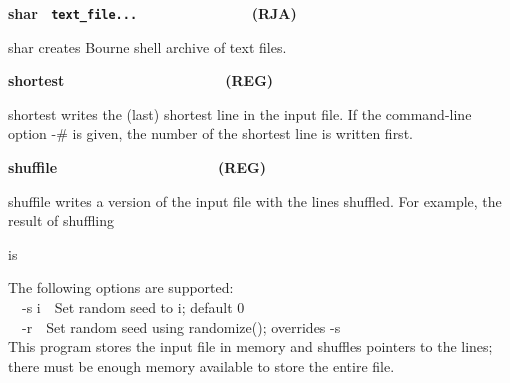 {\sffamily\bfseries
shar
\ \texttt{\textmd{text\_file...\ \ \ \ \ \ \ \ \ \ \ \ \ \ \ \ }}(RJA)}

\textsf{shar} creates Bourne shell archive of text files. 

{\sffamily\bfseries
shortest\ \ \ \ \ \ \ \ \ \ \ \ \ \ \ \ \ \ \ \ (REG)}

\textsf{shortest} writes the (last) shortest line in the input file. If
the command-line option -\# is given, the number of the shortest line
is written first. 

{\sffamily\bfseries
shuffile\ \ \ \ \ \ \ \ \ \ \ \ \ \ \ \ \ \ \ \ (REG)}

\textsf{shuffile} writes a version of the input file with the lines
shuffled. For example, the result of shuffling 


is


The following options are supported:\\
\ \ \textsf{{}-s i}\ \ Set random seed to \textsf{i}; default 0\\
\ \ \textsf{{}-r}\ \ Set random seed using \textsf{randomize()};
overrides \textsf{{}-s}\\
This program stores the input file in memory and shuffles pointers to
the lines; there must be enough memory available to store the entire
file.

